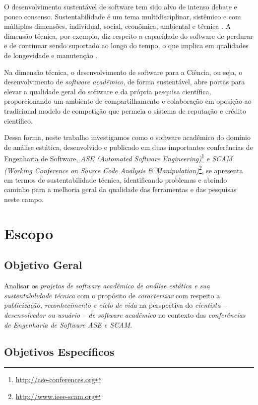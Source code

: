 O desenvolvimento sustentável de software tem sido alvo de intenso debate e
pouco consenso. Sustentabilidade é um tema multidisciplinar, sistêmico e com
múltiplas dimensões, individual, social, econômica, ambiental e técnica
\cite{becker2014karlskrona}. A dimensão técnica, por exemplo, diz respeito a
capacidade do software de perdurar e de continuar sendo suportado ao longo do
tempo, o que implica em qualidades de longevidade e manutenção
\cite{venters2014software}.

Na dimensão técnica, o desenvolvimento de software para a Ciência, ou seja, o
desenvolvimento de {\it software acadêmico}, de forma sustentável, abre portas
para elevar a qualidade geral do software e da própria pesquisa científica,
proporcionando um ambiente de compartilhamento e colaboração em oposição ao
tradicional modelo de competição que permeia o sistema de reputação e crédito
científico.

Dessa forma, neste trabalho investigamos como o software acadêmico do domínio
de análise estática, desenvolvido e publicado em duas importantes conferências
de Engenharia de Software, {\it ASE (Automated Software
Engineering)}\footnote{\url{http://ase-conferences.org}} e {\it SCAM (Working
Conference on Source Code Analysis \&
Manipulation)}\footnote{\url{http://www.ieee-scam.org}}, se apresenta em termos
de sustentabilidade técnica, identificando problemas e abrindo caminho para a
melhoria geral da qualidade das ferramentas e das pesquisas neste campo.

\section{Escopo}

\subsection{Objetivo Geral}

Analisar os \textit{projetos de software acadêmico de análise estática e sua sustentabilidade técnica}
com o propósito de \textit{caracterizar}
com respeito a \textit{publicização, reconhecimento e ciclo de vida}
na perspectiva do \textit{cientista -- desenvolvedor ou usuário -- de software acadêmico}
no contexto das \textit{conferências de Engenharia de Software ASE e SCAM}.

\subsection{Objetivos Específicos}

